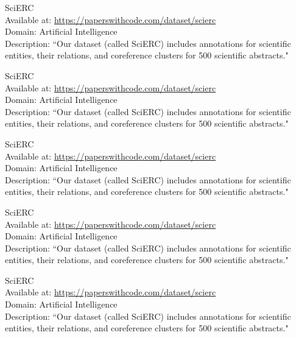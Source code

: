 \begin{dataset}
SciERC~\cite{DBLP:conf/emnlp/LuanHOH18}\\
Available at: \url{https://paperswithcode.com/dataset/scierc}\\
Domain: Artificial Intelligence\\
Description: ``Our dataset (called SciERC) includes annotations for scientific entities, their relations, and coreference clusters for 500 scientific abstracts."~\cite{DBLP:conf/emnlp/LuanHOH18}
\label{dataset:scierc7}
\end{dataset}
\begin{dataset}
SciERC~\cite{DBLP:conf/emnlp/LuanHOH18}\\
Available at: \url{https://paperswithcode.com/dataset/scierc}\\
Domain: Artificial Intelligence\\
Description: ``Our dataset (called SciERC) includes annotations for scientific entities, their relations, and coreference clusters for 500 scientific abstracts."~\cite{DBLP:conf/emnlp/LuanHOH18}
\label{dataset:scierc8}
\end{dataset}
\begin{dataset}
SciERC~\cite{DBLP:conf/emnlp/LuanHOH18}\\
Available at: \url{https://paperswithcode.com/dataset/scierc}\\
Domain: Artificial Intelligence\\
Description: ``Our dataset (called SciERC) includes annotations for scientific entities, their relations, and coreference clusters for 500 scientific abstracts."~\cite{DBLP:conf/emnlp/LuanHOH18}
\label{dataset:scierc9}
\end{dataset}
\begin{dataset}
SciERC~\cite{DBLP:conf/emnlp/LuanHOH18}\\
Available at: \url{https://paperswithcode.com/dataset/scierc}\\
Domain: Artificial Intelligence\\
Description: ``Our dataset (called SciERC) includes annotations for scientific entities, their relations, and coreference clusters for 500 scientific abstracts."~\cite{DBLP:conf/emnlp/LuanHOH18}
\label{dataset:scierc10}
\end{dataset}
\begin{dataset}
SciERC~\cite{DBLP:conf/emnlp/LuanHOH18}\\
Available at: \url{https://paperswithcode.com/dataset/scierc}\\
Domain: Artificial Intelligence\\
Description: ``Our dataset (called SciERC) includes annotations for scientific entities, their relations, and coreference clusters for 500 scientific abstracts."~\cite{DBLP:conf/emnlp/LuanHOH18}
\label{dataset:scierc11}
\end{dataset}
